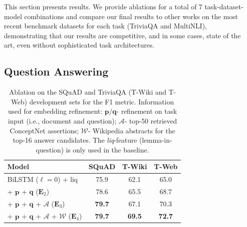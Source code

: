 \documentclass[11pt,a4paper]{article}
\begin{document}
This section presents results. We provide ablations for a total of 7 task-dataset-model combinations and compare our final results to other works on the most recent benchmark datasets for each task (TriviaQA and MultiNLI), demonstrating that our results are competitive, and in some cases, state of the art, even without sophisticated task architectures.

\subsection{Question Answering}

\begin{table}[t]
    \small
    \centering
        \begin{tabular}{l c c c}
            \toprule
            \textbf{Model} & \textbf{SQuAD} & \textbf{T-Wiki} & \textbf{T-Web} \\
            \midrule 
            BiLSTM ($\ell = 0$) + liq & 75.9 & 62.1 & 65.0 \\
            + $\boldsymbol{p}$ + $\boldsymbol{q}$ ($\mathbf{E}_2$) & 78.6 & 65.5 & 68.7 \\ 
            + $\boldsymbol{p}$ + $\boldsymbol{q}$ + $\mathcal{A}$ ($\mathbf{E}_3$) & \textbf{79.7} & 67.1 & 70.3 \\
            + $\boldsymbol{p}$ + $\boldsymbol{q}$ + $\mathcal{A}$ + $\mathcal{W}$ ($\mathbf{E}_4$) & \textbf{79.7} & \textbf{69.5} & \textbf{72.7} \\
            \bottomrule
        \end{tabular}
        \caption{Ablation on the SQuAD and TriviaQA (T-Wiki and T-Web) development sets for the F1 metric. Information used for embedding refinement: $\boldsymbol{p/q}$- refinement on task input (i.e., document and question); $\mathcal{A}$- top-50 retrieved ConceptNet assertions; $\mathcal{W}$- Wikipedia abstracts for the top-16 answer candidates. The \textit{liq}-feature (lemma-in-question) is only used in the baseline.}\label{tab:qa_results}
\end{table}
\end{document}
